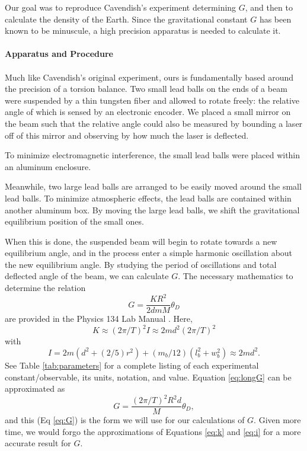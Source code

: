 Our goal was to reproduce Cavendish's experiment determining \(G\), and then to calculate the density of the Earth. 
Since the gravitational constant \(G\) has been known to be minuscule, a high precision apparatus is needed to calculate it.

\paragraph{Apparatus and Procedure}

\paragraph{} Much like Cavendish's original experiment, ours is fundamentally based around the precision of a torsion balance. 
Two small lead balls on the ends of a beam were suspended by a thin tungsten fiber and allowed to rotate freely: the relative angle of which is sensed by an electronic encoder. We placed a small mirror on the beam such that the relative angle could also be measured by bounding a laser off of this mirror and observing by how much the laser is deflected. 

To minimize electromagnetic interference, the small lead balls were placed within an aluminum enclosure.  

Meanwhile, two large lead balls are arranged to be easily moved around the small lead balls. 
To minimize atmospheric effects, the lead balls are contained within another aluminum box. By moving the large lead balls, we shift the gravitational equilibrium position of the small ones. 

When this is done, the suspended beam will begin to rotate towards a new equilibrium angle, and in the process enter a simple harmonic oscillation about the new equilibrium angle. By studying the period of oscillations and total deflected angle of the beam, we can calculate \(G\). The necessary mathematics to determine the relation
\begin{equation}\label{eq:longG}
	G = \dfrac{KR^{2}}{2dm M}\theta_{D}
	\end{equation}
are provided in the Physics 134 Lab Manual \cite{134Manual}. Here,  
\begin{equation}\label{eq:k}
	K \approx (2\pi/T)^{2} I \approx 2md^{2}(2\pi/T)^{2}
	\end{equation}
with
\begin{equation}\label{eq:i}
	I = 2m(d^{2} + (2/5)r^{2}) + (m_{b}/12)(l_{b}^{2} + w_{b}^{2}) \approx 2md^{2}.
\end{equation}
See Table \ref{tab:parameters} for a complete listing of each experimental constant/observable, its units, notation, and value. 
Equation \eqref{eq:longG} can be approximated as 
\begin{equation}\label{eq:G}
	G = \dfrac{(2\pi/T)^{2}R^{2}d}{M}\theta_{D},
	\end{equation}
and this (Eq \eqref{eq:G}) is the form we will use for our calculations of \(G\). 
Given more time, we would forgo the approximations of Equations \eqref{eq:k} and \eqref{eq:i} for a more accurate result for \(G\). 

